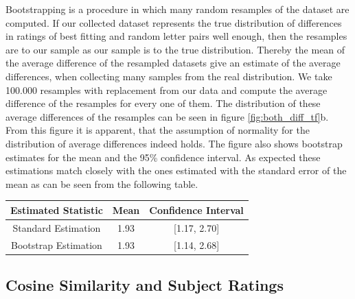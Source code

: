 Bootstrapping is a procedure in which many random resamples of the dataset are computed. If our collected dataset represents the true distribution of differences in ratings of best fitting and random letter pairs well enough, then the resamples are to our sample as our sample is to the true distribution. Thereby the mean of the average difference of the resampled datasets give an estimate of the average differences, when collecting many samples from the real distribution. We take 100.000 resamples with replacement from our data and compute the average difference of the resamples for every one of them. The distribution of these average differences of the resamples can be seen in figure \ref{fig:both_diff_tf}b. From this figure it is apparent, that the assumption of normality for the distribution of average differences indeed holds. The figure also shows bootstrap estimates for the mean and the 95\% confidence interval. As expected these estimations match closely with the ones estimated with the standard error of the mean as can be seen from the following table.

\centering
\begin{tabular}[t]{|c||c|c|}
	\hline 
	Estimated Statistic & Mean & Confidence Interval\tabularnewline
	\hline 
	\hline 
	Standard Estimation & 1.93 & [1.17, 2.70]\tabularnewline
	\hline 
	Bootstrap Estimation & 1.93 & [1.14, 2.68]\tabularnewline
	\hline
\end{tabular}

\justifying


\subsection*{Cosine Similarity and Subject Ratings}

